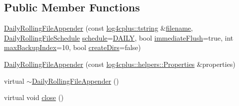 \subsection*{Public Member Functions}
\begin{DoxyCompactItemize}
\item 
\hyperlink{classlog4cplus_1_1DailyRollingFileAppender_ab592e04193b1a4ffc523d1f31d28c7b6}{Daily\-Rolling\-File\-Appender} (const \hyperlink{namespacelog4cplus_a3c9287f6ebcddc50355e29d71152117b}{log4cplus\-::tstring} \&\hyperlink{classlog4cplus_1_1FileAppender_aa04b4a30301c69d784248eccbac2f864}{filename}, \hyperlink{namespacelog4cplus_a8e28400490e25b19a04113f211de4c8f}{Daily\-Rolling\-File\-Schedule} \hyperlink{classlog4cplus_1_1DailyRollingFileAppender_abafd4df2e5d44b4c92f6b7e403946217}{schedule}=\hyperlink{namespacelog4cplus_a8e28400490e25b19a04113f211de4c8fa7f77eb6bafd1349c8b9c4eb91b4336e6}{D\-A\-I\-L\-Y}, bool \hyperlink{classlog4cplus_1_1FileAppender_a89f7c6ae8f630cc2190a376fcc7ca2cc}{immediate\-Flush}=true, int \hyperlink{classlog4cplus_1_1DailyRollingFileAppender_adca7446589f15917965d3224fa0eda93}{max\-Backup\-Index}=10, bool \hyperlink{classlog4cplus_1_1FileAppender_aa9b466ab8de95868505db1b05c645e3f}{create\-Dirs}=false)
\item 
\hyperlink{classlog4cplus_1_1DailyRollingFileAppender_a1a4e5b15cf036d8bacddfed1f51e1ef4}{Daily\-Rolling\-File\-Appender} (const \hyperlink{classlog4cplus_1_1helpers_1_1Properties}{log4cplus\-::helpers\-::\-Properties} \&properties)
\item 
virtual \hyperlink{classlog4cplus_1_1DailyRollingFileAppender_a00d9f808c1f7f6d37e9d584c55782b7d}{$\sim$\-Daily\-Rolling\-File\-Appender} ()
\item 
virtual void \hyperlink{classlog4cplus_1_1DailyRollingFileAppender_a1c3c5f076abe251e3fcf5610c6e1a6a7}{close} ()
\end{DoxyCompactItemize}
